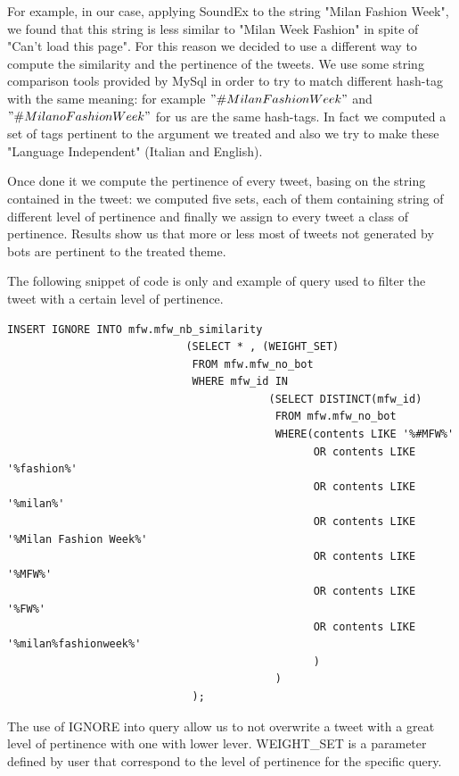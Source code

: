 \documentclass[conference, onecolumn]{IEEEtran}
\begin{document}
For example, in our case, applying SoundEx to the string "Milan Fashion Week", we found that this string is less similar to "Milan Week Fashion" in spite of "Can't load this page".
For this reason we decided to use a different way to compute the similarity and the pertinence of the tweets. We use some string comparison tools provided by MySql in order to try to match different hash-tag with the same meaning: for example $"\# MilanFashionWeek"$ and $"\# MilanoFashionWeek"$ for us are the same hash-tags. In fact we computed a set of tags pertinent to the argument we treated and also we try to make these "Language Independent" (Italian and English).
\medskip

Once done it we compute the pertinence of every tweet, basing on the string contained in the tweet: we computed five sets, each of them containing string of different level of pertinence and finally we assign to every tweet a class of pertinence.
Results show us that more or less most of tweets not generated by bots are pertinent to the treated theme.
\medskip

The following snippet of code is only and example of query used to filter the tweet with a certain level of pertinence.
\begin{lstlisting}
INSERT IGNORE INTO mfw.mfw_nb_similarity
							(SELECT * , (WEIGHT_SET)
							 FROM mfw.mfw_no_bot
							 WHERE mfw_id IN
										 (SELECT DISTINCT(mfw_id)
										  FROM mfw.mfw_no_bot
										  WHERE(contents LIKE '%#MFW%'
												OR contents LIKE '%fashion%'
												OR contents LIKE '%milan%'
												OR contents LIKE '%Milan Fashion Week%'
												OR contents LIKE '%MFW%'
												OR contents LIKE '%FW%'
												OR contents LIKE '%milan%fashionweek%'
											    )
										  )
							 );
\end{lstlisting}
 The use of IGNORE into query allow us to not overwrite a tweet with a great level of pertinence with one with lower lever. WEIGHT\_SET is a parameter defined by user that correspond to the level of pertinence for the specific query.
\end{document}
